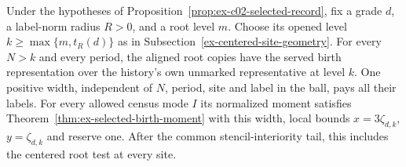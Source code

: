\begin{corollary}
\label{cor:ex-c02-uniform-census}
Under the hypotheses of Proposition~\ref{prop:ex-c02-selected-record},
fix a grade $d$, a label-norm radius $R>0$, and a root level $m$.
Choose its opened level $k\ge\max\{m,t_R(d)\}$ as in
Subsection~\ref{ex-centered-site-geometry}. For every $N>k$ and every
period, the aligned root copies have the served birth representation
over the history's own unmarked representative at level $k$.
One positive width, independent of $N$, period, site and label in the
ball, pays all their labels. For every allowed census mode $I$ its
normalized moment satisfies Theorem~\ref{thm:ex-selected-birth-moment}
with this width, local bounds $x=3\zeta_{d,k}$, $y=\zeta_{d,k}$ and
reserve one. After the common stencil-interiority tail, this includes
the centered root test at every site.
\end{corollary}

